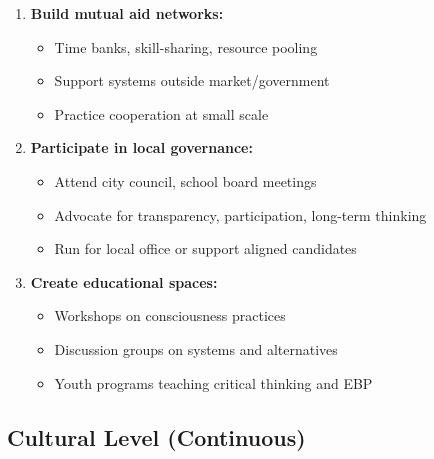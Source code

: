 \documentclass[11pt,a4paper]{article}
\theoremstyle{definition}
\theoremstyle{remark}
\begin{document}
\begin{enumerate}
    \item \textbf{Build mutual aid networks:}
    \begin{itemize}
        \item Time banks, skill-sharing, resource pooling
        \item Support systems outside market/government
        \item Practice cooperation at small scale
    \end{itemize}
    
    \item \textbf{Participate in local governance:}
    \begin{itemize}
        \item Attend city council, school board meetings
        \item Advocate for transparency, participation, long-term thinking
        \item Run for local office or support aligned candidates
    \end{itemize}
    
    \item \textbf{Create educational spaces:}
    \begin{itemize}
        \item Workshops on consciousness practices
        \item Discussion groups on systems and alternatives
        \item Youth programs teaching critical thinking and EBP
    \end{itemize}
\end{enumerate}

\subsection{Cultural Level (Continuous)}
\end{document}
